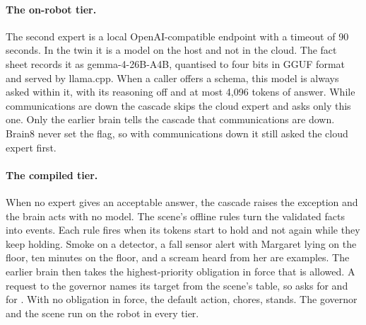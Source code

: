 \paragraph{The on-robot tier.} The second expert is a local OpenAI-compatible endpoint with a timeout
of 90 seconds. In the twin it is a model on the host and not in the cloud. The fact sheet records it
as gemma-4-26B-A4B, quantised to four bits in GGUF format and served by llama.cpp. When a caller
offers a schema, this model is always asked within it, with its reasoning off and at most 4,096
tokens of answer. While
communications are down the cascade skips the cloud expert and asks only this one. Only the
earlier brain tells the cascade that communications are down. Brain8 never set
the flag, so with communications down it still asked the cloud expert first.

\paragraph{The compiled tier.} When no expert gives an acceptable answer, the cascade raises the
exception  and the brain acts with no model. The scene's offline rules turn the
validated facts into events. Each rule fires when its tokens start to hold and not again while they
keep holding. Smoke on a detector, a fall sensor alert with Margaret lying on the floor, ten minutes
on the floor, and a scream heard from her are examples. The earlier brain then takes
the highest-priority obligation in force that is allowed. A request to the governor names its
target from the scene's table, so  asks for  and  for
. With no obligation in force, the default action, chores, stands. The
governor and the scene run on the robot in every tier.

